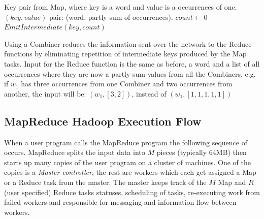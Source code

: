\begin{center}
\newcommand{\combine}{\ensuremath{\mbox{\sc Combine}}}
\begin{algorithm}[h!]
\caption{$\combine(key,values)$}\label{alg:combine}
\begin{algorithmic}[1]
\REQUIRE Key pair from Map, where key is a word and value is a occurrences of one.
\ENSURE $(key,value)$ pair: (word, partly sum of occurrences).
\STATE $count \leftarrow 0$
\medskip
{} 
\ENDFOR
\STATE $EmitIntermediate(key, count)$
\end{algorithmic}
\end{algorithm}
\end{center}
Using a Combiner reduces the information sent over the network to the Reduce functions by eliminating repetition of intermediate keys produced by the Map tasks. Input for the Reduce function is the same as before, a word and a list of all occurrences where they are now a partly sum values from all the Combiners, e.g. if $w_1$ has three occurrences from one Combiner and two occurrences from another, the input will be: $(w_1, [3,2])$, instead of $(w_1,[1,1,1,1,1])$ 

\subsection{MapReduce Hadoop Execution Flow}
When a user program calls the MapReduce program the following sequence of occurs. MapReduce splits the input data into $M$ pieces (typically 64MB) then starts up many copies of the user program on a cluster of machines. One of the copies is a \textit{Master controller}, the rest are workers which each get assigned a Map or a Reduce task from the master. The master keeps track of the $M$ Map and $R$ (user specified) Reduce tasks statuses, scheduling of tasks, re-executing work from failed workers and responsible for messaging and information flow between workers.

